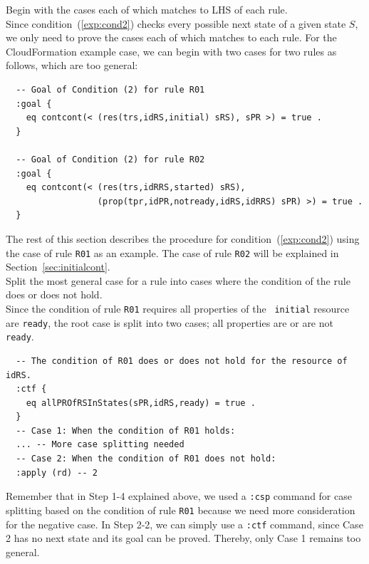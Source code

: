 \documentclass[12pt]{report}
\begin{document}
 Begin with the cases each of which matches to
LHS of each rule. \\ Since condition~(\ref{exp:cond2}) checks every
possible next state of a given state $S$, we only need to prove the
cases each of which matches to each rule. For the CloudFormation
example case, we can begin with two cases for two rules as follows,
which are too general:
\small
\begin{verbatim}
  -- Goal of Condition (2) for rule R01
  :goal {
    eq contcont(< (res(trs,idRS,initial) sRS), sPR >) = true .
  }

  -- Goal of Condition (2) for rule R02
  :goal {
    eq contcont(< (res(trs,idRRS,started) sRS),
                  (prop(tpr,idPR,notready,idRS,idRRS) sPR) >) = true .
  }
\end{verbatim}
\normalsize

The rest of this section describes the procedure for condition~(\ref{exp:cond2})
using the case of rule {\tt R01} as an example. The case of rule {\tt R02} will
be explained in Section~\ref{sec:initialcont}.\\

 Split the most general case for a rule into
cases where the condition of the rule does or does not hold. \\ Since
the condition of rule {\tt R01} requires all properties of the {\tt
  initial} resource are {\tt ready}, the root case is split into two
cases; all properties are or are not {\tt ready}. 
\small
\begin{verbatim}
  -- The condition of R01 does or does not hold for the resource of idRS.
  :ctf {
    eq allPROfRSInStates(sPR,idRS,ready) = true .
  }
  -- Case 1: When the condition of R01 holds:
  ... -- More case splitting needed
  -- Case 2: When the condition of R01 does not hold:
  :apply (rd) -- 2
\end{verbatim}
\normalsize
Remember that in Step 1-4 explained above, we used a {\tt :csp}
command for case splitting based on the condition of rule {\tt R01}
because we need more consideration for the negative case.  In Step
2-2, we can simply use a {\tt :ctf} command, since Case 2 has no next
state and its goal can be proved. Thereby, only Case 1 remains too
general. \\
\end{document}
